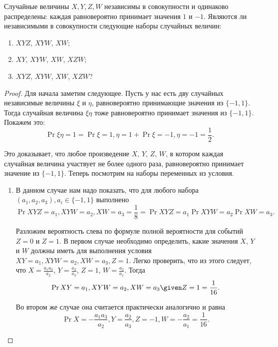 \begin{problem}
    Случайные величины \(X, Y, Z, W\) независимы в совокупности и одинаково распределены: каждая равновероятно принимает значения \(1\) и \(-1\). Являются ли независимыми в совокупности следующие наборы случайных величин:
    
    \begin{enumerate}
        \item \(XYZ\), \(XYW\), \(XW\);
        \item \(XY\), \(XYW\), \(XW\), \(XZW\);
        \item \(XYZ\), \(XYW\), \(XW\), \(XZW\)?
    \end{enumerate}

\end{problem}
\begin{proof}
    Для начала заметим следующее. Пусть у нас есть дву случайных независимые величины \(\xi\) и \(\eta\), равновероятно принимающие значения из \(\{-1, 1\}\). Тогда случайная величина \(\xi\eta\) тоже равновероятно принимает значения из \(\{-1, 1\}\). Покажем это:
    \[\Pr{\xi\eta = 1} = \Pr{\xi = 1, \eta = 1} + \Pr{\xi = -1, \eta = -1} = \frac{1}{2}.\]
    
    Это доказывает, что любое произведение \(X\), \(Y\), \(Z\), \(W\), в котором каждая случайная величина участвует не более одного раза, равновероятно принимает значение из \(\{-1, 1\}\). Теперь посмотрим на наборы переменных из условия.
    \begin{enumerate}
        \item В данном случае нам надо показать, что для любого набора \((a_1, a_2, a_3), a_i \in \{-1, 1\}\) выполнено
        \[\Pr{XYZ = a_1, XYW = a_2, XW = a_3} = \frac{1}{8} = \Pr{XYZ = a_1}\Pr{XYW = a_2}\Pr{XW = a_3}.\]
        
        Разложим вероятность слева по формуле полной вероятности для событий \(Z = 0\) и \(Z = 1\). В первом случае необходимо определить, какие значения \(X\), \(Y\) и \(W\) должны иметь для выполнения условия \(XY = a_1, XYW = a_2, XW = a_3, Z = 1\). Легко проверить, что из этого следует, что \(X = \frac{a_1a_3}{a_2}\), \(Y = \frac{a_2}{a_3}\), \(Z = 1\), \(W = \frac{a_2}{a_1}\). Тогда
        \[\Pr{XY = a_1, XYW = a_2, XW = a_3 \given Z = 1} = \frac{1}{16}.\]
        
        Во втором же случае она считается практически аналогично и равна
        \[\Pr{X = -\frac{a_1a_3}{a_2}, Y = \frac{a_2}{a_3}, Z = -1, W = -\frac{a_2}{a_1}} = \frac{1}{16}.\]
        

\end{enumerate}
\end{proof}

